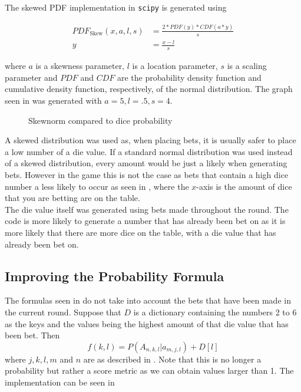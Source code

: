 \noindent The skewed PDF implementation in \texttt{scipy} is generated using

\begin{align*}
    PDF_{\text{Skew}}(x, a, l, s) &= \frac{2 * PDF(y) * CDF(a * y)}{s} \\
    y &= \frac{x - l}{s}
\end{align*}

where $a$ is a skewness parameter, $l$ is a location parameter, $s$ is a scaling parameter and $PDF$ and $CDF$ are the probability density function and cumulative density function, respectively, of the normal distribution. The graph seen in  was generated with $a = 5, l = .5, s = 4$.

\begin{figure}
\centering
{}
\hfill
{}
\caption{Skewnorm compared to dice probability}
\end{figure}

A skewed distribution was used as, when placing bets, it is usually safer to place a low number of a die value. If a standard normal distribution was used instead of a skewed distribution, every amount would be just a likely when generating bets. However in the game this is not the case as bets that contain a high dice number a less likely to occur as seen in , where the $x$-axis is the amount of dice that you are betting are on the table.\\

The die value itself was generated using bets made throughout the round. The code is more likely to generate a number that has already been bet on as it is more likely that there are more dice on the table, with a die value that has already been bet on.

\subsection{Improving the Probability Formula}

The formulas seen in  do not take into account the bets that have been made in the current round. Suppose that $D$ is a dictionary containing the numbers 2 to 6 as the keys and the values being the highest amount of that die value that has been bet. Then
\begin{equation}\label{eq:fkl}
    f(k, l) = P(A_{n, k, l} | a_{m, j, l}) + D[l]
\end{equation}
where $j, k, l, m$ and $n$ are as described in . Note that this is no longer a probability but rather a score metric as we can obtain values larger than 1. The implementation can be seen in 

